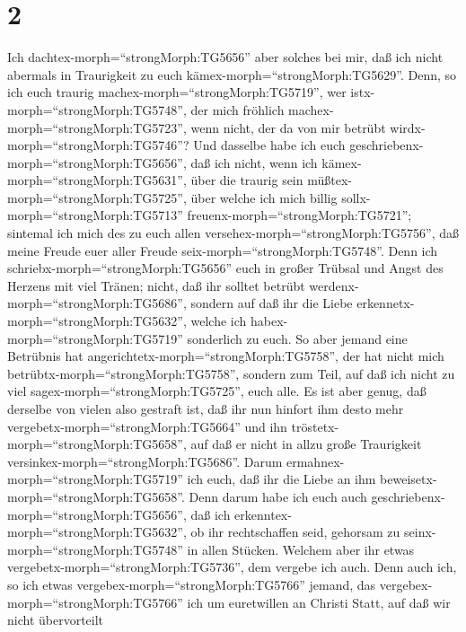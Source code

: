 \hypertarget{section-1}{%
\section{2}\label{section-1}}

 Ich dachtex-morph=``strongMorph:TG5656'' aber solches bei
mir, daß ich nicht abermals in Traurigkeit zu euch
kämex-morph=``strongMorph:TG5629''.  Denn, so ich euch
traurig machex-morph=``strongMorph:TG5719'', wer
istx-morph=``strongMorph:TG5748'', der mich fröhlich
machex-morph=``strongMorph:TG5723'', wenn nicht, der da von mir betrübt
wirdx-morph=``strongMorph:TG5746''?  Und dasselbe habe ich
euch geschriebenx-morph=``strongMorph:TG5656'', daß ich nicht, wenn ich
kämex-morph=``strongMorph:TG5631'', über die traurig sein
müßtex-morph=``strongMorph:TG5725'', über welche ich mich billig
sollx-morph=``strongMorph:TG5713'' freuenx-morph=``strongMorph:TG5721'';
sintemal ich mich des zu euch allen
versehex-morph=``strongMorph:TG5756'', daß meine Freude euer aller
Freude seix-morph=``strongMorph:TG5748''.  Denn ich
schriebx-morph=``strongMorph:TG5656'' euch in großer Trübsal und Angst
des Herzens mit viel Tränen; nicht, daß ihr solltet betrübt
werdenx-morph=``strongMorph:TG5686'', sondern auf daß ihr die Liebe
erkennetx-morph=``strongMorph:TG5632'', welche ich
habex-morph=``strongMorph:TG5719'' sonderlich zu euch.  So
aber jemand eine Betrübnis hat
angerichtetx-morph=``strongMorph:TG5758'', der hat nicht mich
betrübtx-morph=``strongMorph:TG5758'', sondern zum Teil, auf daß ich
nicht zu viel sagex-morph=``strongMorph:TG5725'', euch alle.
 Es ist aber genug, daß derselbe von vielen also gestraft
ist,  daß ihr nun hinfort ihm desto mehr
vergebetx-morph=``strongMorph:TG5664'' und ihn
tröstetx-morph=``strongMorph:TG5658'', auf daß er nicht in allzu große
Traurigkeit versinkex-morph=``strongMorph:TG5686''.  Darum
ermahnex-morph=``strongMorph:TG5719'' ich euch, daß ihr die Liebe an ihm
beweisetx-morph=``strongMorph:TG5658''.  Denn darum habe ich
euch auch geschriebenx-morph=``strongMorph:TG5656'', daß ich
erkenntex-morph=``strongMorph:TG5632'', ob ihr rechtschaffen seid,
gehorsam zu seinx-morph=``strongMorph:TG5748'' in allen Stücken.
 Welchem aber ihr etwas
vergebetx-morph=``strongMorph:TG5736'', dem vergebe ich auch. Denn auch
ich, so ich etwas vergebex-morph=``strongMorph:TG5766'' jemand, das
vergebex-morph=``strongMorph:TG5766'' ich um euretwillen an Christi
Statt,  auf daß wir nicht übervorteilt
